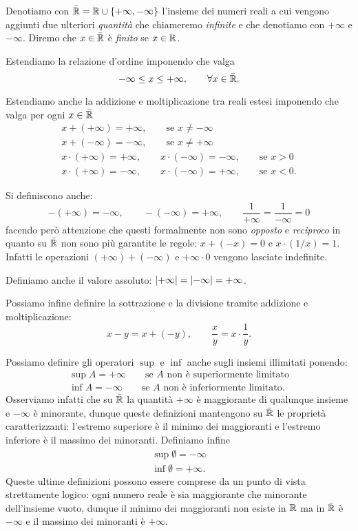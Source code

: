 \begin{definition}
\mymargin{$\bar{\RR}$}
Denotiamo con $\bar {\mathbb R}=\mathbb R \cup {\left\{ +\infty, -\infty \right\}}$ l'insieme dei numeri reali
\mymargin{$+\infty$, $-\infty$}
a cui vengono aggiunti due ulteriori \emph{quantità} che chiameremo
\emph{infinite} e che denotiamo con $+\infty$ e $-\infty$.
Diremo che $x\in \bar {\mathbb R}$ è \emph{finito} se $x\in \mathbb R$.
\end{definition}


Estendiamo la relazione d'ordine imponendo che valga
\[
  -\infty \le x \le +\infty, \qquad \forall x \in \bar{\mathbb R}.
\]

Estendiamo anche la addizione e moltiplicazione
tra reali estesi imponendo che valga per ogni $x\in \bar {\mathbb R}$
\begin{gather*}
  x + (+\infty) = +\infty, \qquad \text{se $x\neq -\infty$}\\
  x + (-\infty) = -\infty, \qquad \text{se $x\neq +\infty$}\\
  x \cdot (+\infty) = +\infty, \qquad
  x \cdot (-\infty) = -\infty, \qquad \text{se $x>0$} \\
  x \cdot (+\infty) = -\infty, \qquad
  x \cdot (-\infty) = +\infty, \qquad \text{se $x<0$}.
\end{gather*}

Si definiscono anche:
\[
 -(+\infty) = -\infty, \qquad
 -(-\infty) = +\infty, \qquad
 \frac{1}{+\infty} = \frac{1}{-\infty}=0
\]
facendo però attenzione che
questi formalmente non sono \emph{opposto}
e \emph{reciproco} in quanto
su $\bar {\mathbb R}$ non sono più garantite
le regole: $x + (-x) = 0$ e $x \cdot (1/x) = 1$.
Infatti
le operazioni $(+\infty) + (-\infty)$ e $+\infty \cdot 0$ vengono
lasciate indefinite.

Definiamo anche il valore assoluto: ${\left|+\infty\right|} = {\left|-\infty\right|} = +\infty$.

Possiamo infine definire la sottrazione e la divisione tramite
addizione e moltiplicazione:
\[
  x - y = x + (-y), \qquad \frac{x}{y} = x \cdot \frac{1}{y}.
\]

Possiamo definire gli operatori $\sup$ e $\inf$
anche sugli insiemi illimitati ponendo:
\begin{align*}
  \sup A = +\infty \qquad \text{se $A$ non è superiormente limitato}\\
  \inf A = -\infty \qquad \text{se $A$ non è inferiormente limitato}.
\end{align*}
Osserviamo infatti che su $\bar {\mathbb R}$ la quantità $+\infty$
è maggiorante di qualunque insieme e $-\infty$ è minorante, dunque
queste definizioni mantengono su $\bar {\mathbb R}$ le proprietà caratterizzanti:
l'estremo superiore è il minimo dei maggioranti e
l'estremo inferiore è il massimo dei minoranti.
Definiamo infine
\begin{align*}
  \sup \emptyset = -\infty\\
  \inf \emptyset = +\infty.
\end{align*}
Queste ultime definizioni possono essere comprese da un punto di vista
strettamente logico: ogni numero reale è sia maggiorante che minorante
dell'insieme vuoto, dunque il minimo dei maggioranti non esiste in $\mathbb R$
ma in $\bar {\mathbb R}$ è $-\infty$
e il massimo dei minoranti è $+\infty$.

